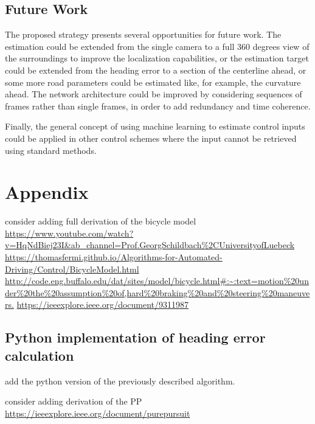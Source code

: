 \documentclass[a4paper,12pt,sort&compress]{article}
\begin{document}
\subsection{Future Work}
The proposed strategy presents several opportunities for future work. The estimation could be
extended from the single camera to a full 360 degrees view of the surroundings to improve the
localization capabilities, or the estimation target could be extended from the heading error to a
section of the centerline ahead, or some more road parameters could be estimated like, for example,
the curvature ahead. The network architecture could be improved by considering sequences of frames
rather than single frames, in order to add redundancy and time coherence. 

Finally, the general concept of using machine learning to estimate control inputs could be applied
in other control schemes where the input cannot be retrieved using standard methods.


\newpage
\section{Appendix}
consider adding full derivation of the bicycle model \url{https://www.youtube.com/watch?v=HqNdBiej23I&ab_channel=Prof.GeorgSchildbach%2CUniversityofLuebeck}
\url{https://thomasfermi.github.io/Algorithms-for-Automated-Driving/Control/BicycleModel.html}
\url{http://code.eng.buffalo.edu/dat/sites/model/bicycle.html#:~:text=motion%20under%20the%20assumption%20of,hard%20braking%20and%20steering%20maneuvers.}
\url{https://ieeexplore.ieee.org/document/9311987}

\subsection{Python implementation of heading error calculation}
add the python version of the previously described algorithm.

consider adding derivation of the PP
\url{https://ieeexplore.ieee.org/document/purepursuit}


\newpage
\end{document}
